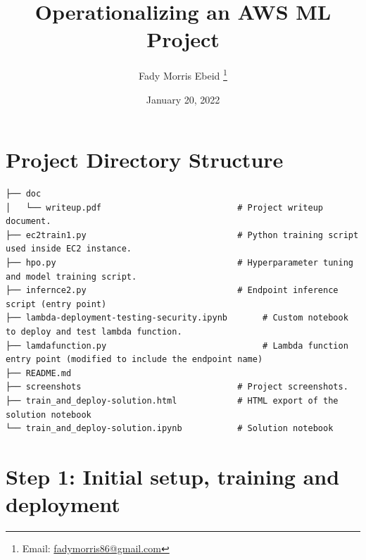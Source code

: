 \documentclass[a4paper
]{article}
\author{}
\date{}
\title{Operationalizing an AWS ML Project}
\author{
  Fady Morris Ebeid
  \thanks{Email: \href{mailto:fadymorris86@gmail.com}{fadymorris86@gmail.com}}
}
\date{January 20, 2022}
\begin{document}


{
\makeatletter
\addtocounter{footnote}{1} %
\renewcommand\thefootnote{\@fnsymbol\c@footnote}%
\makeatother
\maketitle
}
\newpage
\tableofcontents

\newpage
{}

\hypertarget{project-directory-structure}{%
\section{Project Directory
Structure}\label{project-directory-structure}}


\begin{lstlisting}[caption=Project Directory Structure]
├── doc
│   └── writeup.pdf                           # Project writeup document.
├── ec2train1.py                              # Python training script used inside EC2 instance.
├── hpo.py                                    # Hyperparameter tuning and model training script.
├── infernce2.py                              # Endpoint inference script (entry point)
├── lambda-deployment-testing-security.ipynb       # Custom notebook to deploy and test lambda function.
├── lamdafunction.py                               # Lambda function entry point (modified to include the endpoint name)
├── README.md
├── screenshots                               # Project screenshots.
├── train_and_deploy-solution.html            # HTML export of the solution notebook
└── train_and_deploy-solution.ipynb           # Solution notebook
\end{lstlisting}

\newpage
\hypertarget{step-1-initial-setup-training-and-deployment}{%
\section{Step 1: Initial setup, training and
deployment}\label{step-1-initial-setup-training-and-deployment}}
\end{document}
